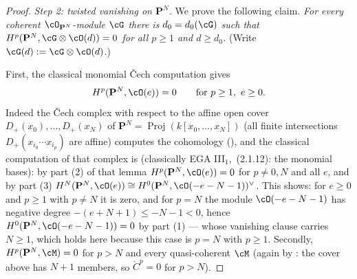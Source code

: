 \begin{proof}
\emph{Step 2: twisted vanishing on $\mathbf P^N$.}  We prove the
following claim.  \emph{For every coherent $\cO_{\mathbf
P^N}$-module $\cG$ there is $d_0=d_0(\cG)$ such that
$H^p(\mathbf P^N,\cG\otimes\cO(d))=0$ for all $p\ge1$ and
$d\ge d_0$.}  (Write $\cG(d):=\cG\otimes\cO(d)$.)

First, the classical monomial Čech computation gives
\[
H^p(\mathbf P^N,\cO(e))=0\qquad\text{for }p\ge1,\ e\ge0 .
\]
Indeed the Čech complex with respect to the affine open cover
$D_+(x_0),\dots,D_+(x_N)$ of
$\mathbf P^N=\operatorname{Proj}(k[x_0,\dots,x_N])$
(all finite intersections $D_+(x_{i_0}\cdots x_{i_p})$ are affine)
computes the cohomology (), and the
classical computation of that complex is
 (classically
EGA III$_1$, \,(2.1.12): the monomial bases): by part (2) of that lemma
$H^p(\mathbf P^N,\cO(e))=0$ for $p\neq0,N$ and all $e$, and by part (3)
$H^N(\mathbf P^N,\cO(e))\cong H^0(\mathbf P^N,\cO(-e-N-1))^\vee$.
This shows: for $e\ge0$ and $p\ge1$ with $p\neq N$ it is zero, and for
$p=N$ the module $\cO(-e-N-1)$ has negative degree
$-(e+N+1)\le-N-1<0$, hence $H^0(\mathbf P^N,\cO(-e-N-1))=0$ by part
(1) --- whose vanishing clause carries $N\ge1$, which holds here
because this case is $p=N$ with $p\ge1$.  Secondly,
$H^p(\mathbf P^N,\cM)=0$ for $p>N$ and every quasi-coherent $\cM$
(again by : the cover above has $N+1$
members, so $\check C^p=0$ for $p>N$).


\end{proof}
